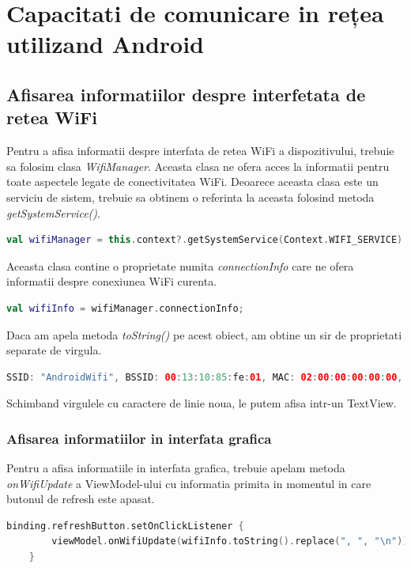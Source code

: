 \section{Capacitati de comunicare in rețea utilizand Android}

\subsection{Afisarea informatiilor despre interfetata de retea WiFi}
Pentru a afisa informatii despre interfata de retea WiFi a dispozitivului, trebuie sa folosim clasa \textit{WifiManager}.
Aceasta clasa ne ofera acces la informatii pentru toate aspectele legate de conectivitatea WiFi.
Deoarece aceasta clasa este un serviciu de sistem, trebuie sa obtinem o referinta la aceasta folosind metoda \textit{getSystemService()}.
\begin{lstlisting}[language=Kotlin]
    val wifiManager = this.context?.getSystemService(Context.WIFI_SERVICE) as WifiManager;
\end{lstlisting}
Aceasta clasa contine o proprietate numita \textit{connectionInfo} care ne ofera informatii despre conexiunea WiFi curenta.
\begin{lstlisting}[language=Kotlin]
    val wifiInfo = wifiManager.connectionInfo;
\end{lstlisting}
Daca am apela metoda \textit{toString()} pe acest obiect, am obtine un sir de proprietati separate de virgula.
\begin{lstlisting}[language=Kotlin]
    SSID: "AndroidWifi", BSSID: 00:13:10:85:fe:01, MAC: 02:00:00:00:00:00, IP: /10.0.2.16, Security type: 0, Supplicant state: COMPLETED, Wi-Fi standard: 1, RSSI: -50, Link speed: 1Mbps, Tx Link speed: 1Mbps, Max Supported Tx Link speed: 11Mbps, Rx Link speed: 2Mbps, Max Supported Rx Link speed: 11Mbps, Frequency: 2447MHz, Net ID: 0, Metered hint: false, score: 60, isUsable: true, CarrierMerged: false, SubscriptionId: -1, IsPrimary: -1, Trusted: true, Restricted: false, Ephemeral: false, OEM paid: false, OEM private: false, OSU AP: false, FQDN: <none>, Provider friendly name: <none>, Requesting package name: <none>"AndroidWifi"openMLO Information: , Is TID-To-Link negotiation supported by the AP: false, AP MLD Address: <none>, AP MLO Link Id: <none>, AP MLO Affiliated links: <none>
\end{lstlisting}
Schimband virgulele cu caractere de linie noua, le putem afisa intr-un TextView.
\subsubsection{Afisarea informatiilor in interfata grafica}
Pentru a afisa informatiile in interfata grafica, trebuie apelam metoda \textit{onWifiUpdate} a ViewModel-ului cu informatia primita
in momentul in care butonul de refresh este apasat.
\begin{lstlisting}[language=Kotlin]
    binding.refreshButton.setOnClickListener {
        viewModel.onWifiUpdate(wifiInfo.toString().replace(", ", "\n"))
    }
\end{lstlisting}
